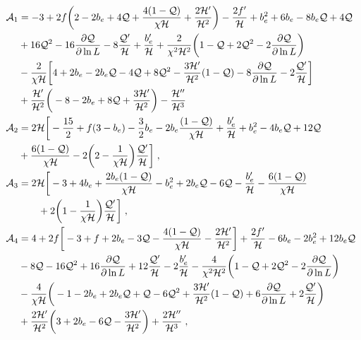 \begin{align}
\mathcal{A}_{1} &= {-3} +2f\bigg({2}-2b_{e}+{4}\mathcal{Q}+\frac{4(1-\mathcal{Q})}{\chi\cH} +\frac{2\cH'}{\cH^{2}}\bigg) -\frac{2f'}{\cH} +b_{e}^{2}+ 6b_{e}-8b_{e}\mathcal{Q}+4\mathcal{Q} \nonumber \\
& +16\mathcal{Q}^{2} -16\frac{\partial \mathcal{Q}}{\partial \ln{L}} -8\frac{\mathcal{Q}'}{\cH} + \frac{b_{e}'}{\cH}+\frac{2}{\chi^{2}\cH^{2}}\bigg(1-\mathcal{Q}+2\mathcal{Q}^{2}-2\frac{\partial \mathcal{Q}}{\partial \ln{{L}}}\bigg)  \nonumber\\ 
& - \frac{2}{\chi\cH}\bigg[4+2b_{e}-2b_{e}\mathcal{Q}-4\mathcal{Q}+8\mathcal{Q}^{2}-\frac{3\cH'}{\cH^{2}}(1-\mathcal{Q})- 8\frac{\partial \mathcal{Q}}{\partial \ln{{L}}} - 2\frac{\mathcal{Q}'}{\cH}\bigg] \nonumber \\
& + \frac{\cH'}{\cH^{2}}\bigg(-8-2b_{e}+{8}\mathcal{Q}+\frac{3\cH'}{\cH^{2}}\bigg) - \frac{\cH''}{\cH^{3}} \\
\mathcal{A}_{2} &= 2\cH\bigg[-\frac{15}{2}+f(3-b_{e})-\frac{3}{2}b_{e}-2b_{e}\frac{(1-\mathcal{Q})}{\chi\cH}+\frac{b_{e}'}{\cH}+b_{e}^{2}-4b_{e}\mathcal{Q}+12\mathcal{Q} \nonumber \\
&+ \frac{6(1-\mathcal{Q})}{\chi\cH} - 2\bigg(2-\frac{1}{\chi\cH}\bigg)\frac{\mathcal{Q}'}{\cH}\bigg]\;, \label{e4} \\
\mathcal{A}_{3} &= 2\cH\bigg[-3+4b_{e}+\frac{2b_{e}(1-\mathcal{Q})}{\chi\cH}-b_{e}^{2}+2b_{e}\mathcal{Q} -6\mathcal{Q}-\frac{b_{e}'}{\cH}-\frac{6(1-\mathcal{Q})}{\chi\cH} \nonumber \\
& \qquad +2\bigg(1-\frac{1}{\chi\cH}\bigg)\frac{\mathcal{Q}'}{\cH}\bigg]\;, \label{e3} 
\\ 
\mathcal{A}_{4} &= 4 +2f\bigg[-3+f+2b_{e}-3\mathcal{Q}-\frac{4(1-\mathcal{Q})}{\chi\cH}-\frac{2\cH'}{\cH^{2}}\bigg] +\frac{2f'}{\cH}-6b_{e}-2b_{e}^{2}+12b_{e}\mathcal{Q} \nonumber\\
& -{8}\mathcal{Q} - 16\mathcal{Q}^{2}+16\frac{\partial \mathcal{Q}}{\partial \ln{{L}}} +12\frac{\mathcal{Q}'}{\cH} -2\frac{b_{e}'}{\cH} -\frac{4}{\chi^{2}\cH^{2}}\bigg(1-\mathcal{Q}+2\mathcal{Q}^{2}-2\frac{\partial \mathcal{Q}}{\partial \ln{{L}}}\bigg)  \nonumber \\
& - \frac{4}{\chi \cH}\bigg(-1 -2b_{e}+2b_{e}\mathcal{Q}+\mathcal{Q}-6\mathcal{Q}^{2}+\frac{3\cH'}{\cH^{2}}(1-\mathcal{Q}) +6\frac{\partial \mathcal{Q}}{\partial \ln{{L}}} + 2\frac{\mathcal{Q}'}{\cH}\bigg)  \nonumber \\
& + \frac{2\cH'}{\cH^{2}}\bigg(3+2b_{e}-6\mathcal{Q}-\frac{3\cH'}{\cH^{2}}\bigg) + \frac{2\cH''}{\cH^{3}}\;, \label{e5}\\

\end{align}
